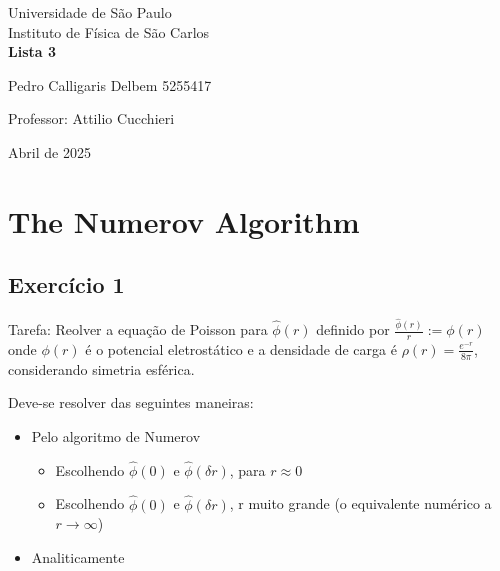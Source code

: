 \documentclass[12pt, a4paper]{article} %
\begin{document}
	
	\begin{titlepage}
		\begin{center}
\Huge{Universidade de São Paulo}\\
\large{Instituto de Física de São Carlos}\\
\vspace{20pt}
\vspace{200pt}
\textbf{Lista 3}\\
\vspace{8cm}
		\end{center}

\begin{flushleft}
\begin{tabbing}
Pedro Calligaris Delbem 5255417\\
\end{tabbing}
\vspace{0.5cm}
Professor: Attilio Cucchieri\\		
		\end{flushleft}
	
		\begin{center}
			\vspace{\fill}
	Abril de 2025	
		\end{center}
	\end{titlepage}

	\tableofcontents 
	\thispagestyle{empty}
	\newpage

\section{The Numerov Algorithm}

    \subsection{Exerc\'icio 1}

        Tarefa: Reolver a equa\c{c}\~ao de Poisson para $\hat{\phi}(r)$ definido por $\frac{\hat{\phi}(r)}{r} := \phi(r)$ onde $\phi(r)$ \'e o potencial eletrost\'atico e a densidade de carga \'e $\rho(r) = \frac{e^{-r}}{8 \pi}$, considerando simetria esf\'erica.
        
        Deve-se resolver das seguintes maneiras:
        \begin{itemize} 
            \item Pelo algoritmo de Numerov
            \begin{itemize}
                \item Escolhendo $\hat{\phi}(0)$ e $\hat{\phi}(\delta r)$, para $r \approx 0$
                \item Escolhendo $\hat{\phi}(0)$ e $\hat{\phi}(\delta r)$, r muito grande (o equivalente num\'erico a $r \to \infty$)
            \end{itemize}
            \item Analiticamente
        \end{itemize}
\end{document}
